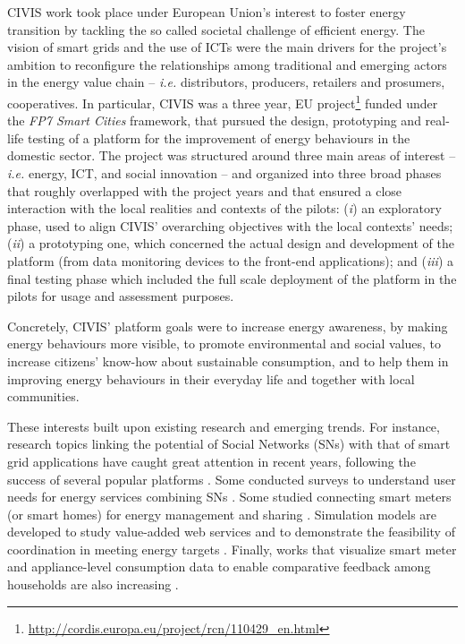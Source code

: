 CIVIS work took place under European Union’s interest to foster energy transition by tackling the 
so called societal challenge of efficient energy. The vision of smart grids and the use of ICTs were 
the main drivers for the project's ambition to reconfigure the relationships among traditional and 
emerging actors in the energy value chain -- \textit{i.e.} distributors, producers, retailers and 
prosumers, cooperatives. In particular, CIVIS was a three year, EU 
project\footnote{\url{http://cordis.europa.eu/project/rcn/110429\_en.html}} funded under the 
\textit{FP7 Smart Cities} framework, that pursued the design, prototyping and real-life testing of 
a platform for the improvement of energy behaviours in the domestic sector. The project was 
structured around three main areas of interest -- \textit{i.e.} energy, ICT, and social innovation 
-- and organized into three broad phases that roughly overlapped with the project years and that 
ensured a close interaction with the local realities and contexts of the pilots: (\textit{i}) an 
exploratory phase, used to align CIVIS’ overarching objectives with the local contexts’ needs;
(\textit{ii}) a prototyping one, which concerned the actual design and development of the platform 
(from data monitoring devices to the front-end applications); and (\textit{iii}) a final testing 
phase which included the full scale deployment of the platform in the pilots for usage and 
assessment purposes.

Concretely, CIVIS' platform goals were to increase energy awareness, by making energy behaviours more visible, to promote
environmental and social values, to increase citizens' know-how about sustainable consumption, and to help
them in improving energy behaviours in their everyday life and together with local communities.

These interests built upon existing research and emerging trends.
For instance, research topics linking the potential of Social Networks (SNs) with that of smart grid applications 
have caught great attention in recent years, following the success of several popular platforms 
\cite{Boslet2010,Chima2011,Erickson2012,Fang2013,Huang2015}. 
Some conducted surveys to understand user needs for energy services combining SNs \cite{Silva2012}. 
Some studied connecting smart meters (or smart homes) for energy management and
sharing \cite{Ciuciu2012,Steinheimer2012}. 
Simulation models are developed to study value-added web services \cite{De-Haan2011,Lei2012,Chatzidimitriou2013} and to 
demonstrate the feasibility of coordination in meeting energy targets \cite{Worm2013,Skopik2014}.
Finally, works that visualize smart meter and appliance-level consumption data to enable comparative 
feedback among households are also increasing \cite{Petkov2011,Weiss2012,Dillahunt2014}.

